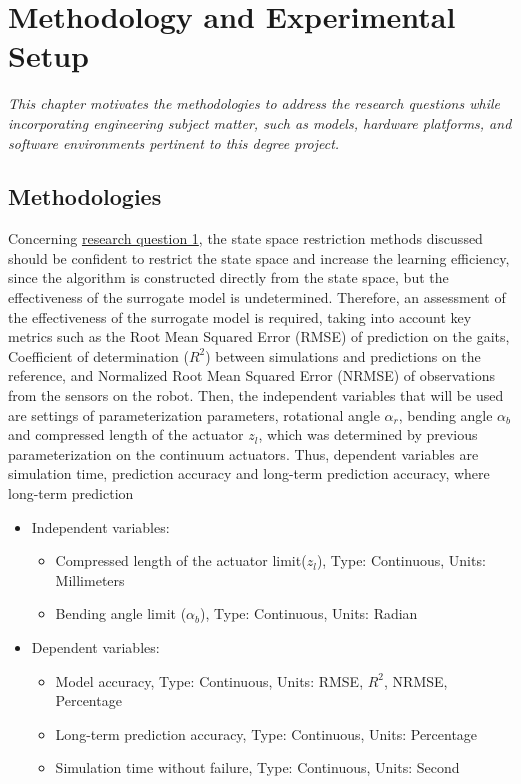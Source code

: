 \chapter{Methodology and Experimental Setup}
\label{chap3}
\textit{This chapter motivates the methodologies to address the research questions while incorporating engineering subject matter, such as models, hardware platforms, and software environments pertinent to this degree project.} 

\section{Methodologies}
Concerning \hyperref[rq1]{research question 1}, the state space restriction methods discussed should be confident to restrict the state space and increase the learning efficiency, since the algorithm is constructed directly from the state space, but the effectiveness of the surrogate model is undetermined. Therefore, an assessment of the effectiveness of the surrogate model is required, taking into account key metrics such as the Root Mean Squared Error (RMSE) of prediction on the gaits, Coefficient of determination ($R^2$) between simulations and predictions on the reference, and Normalized Root Mean Squared Error (NRMSE) of observations from the sensors on the robot. Then, the independent variables that will be used are settings of parameterization parameters, rotational angle $\alpha_r$, bending angle $\alpha_b$ and compressed length of the actuator $z_l$, which was determined by previous parameterization on the continuum actuators\cite{jiOmnidirectionalWalkingQuadruped2022}. Thus, dependent variables are simulation time, prediction accuracy and long-term prediction accuracy, where long-term prediction 
\begin{itemize}
    \item Independent variables: 
    \begin{itemize}
        \item Compressed length of the actuator limit($z_l$), Type: Continuous, Units: Millimeters
        \item Bending angle limit ($\alpha_b$), Type: Continuous, Units: Radian
    \end{itemize}
    \item Dependent variables:
    \begin{itemize}
        \item Model accuracy, Type: Continuous, Units: RMSE, $R^2$, NRMSE, Percentage
        \item Long-term prediction accuracy, Type: Continuous, Units: Percentage
        \item Simulation time without failure, Type: Continuous, Units: Second
    \end{itemize}
\end{itemize}

